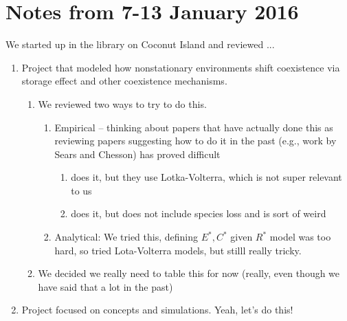 \documentclass[11pt,a4paper,oneside]{article}
\begin{document}
\section{Notes from 7-13 January 2016}
We started up in the library on Coconut Island and reviewed ...
\begin{enumerate}
\item Project that modeled how nonstationary environments shift coexistence via storage effect and other coexistence mechanisms. 
\begin{enumerate}
\item We reviewed two ways to try to do this.
\begin{enumerate}
\item Empirical -- thinking about papers that have actually done this as reviewing papers suggesting how to do it in the past (e.g., work by Sears and Chesson) has proved difficult
\begin{enumerate}
\item \citet{godoy2014} does it, but they use Lotka-Volterra, which is not super relevant to us
\item \citet{Angert:2009} does it, but does not include species loss and is sort of weird
\end{enumerate}
\item Analytical: We tried this, defining $E^{*}, C^{*}$ given $R^{*}$ model was too hard, so tried Lota-Volterra models, but stilll really tricky. 
\end{enumerate}
\item We decided we really need to table this for now (really, even though we have said that a lot in the past)
\end{enumerate}
\item Project focused on concepts and simulations. Yeah, let's do this!
\end{enumerate}
\end{document}
